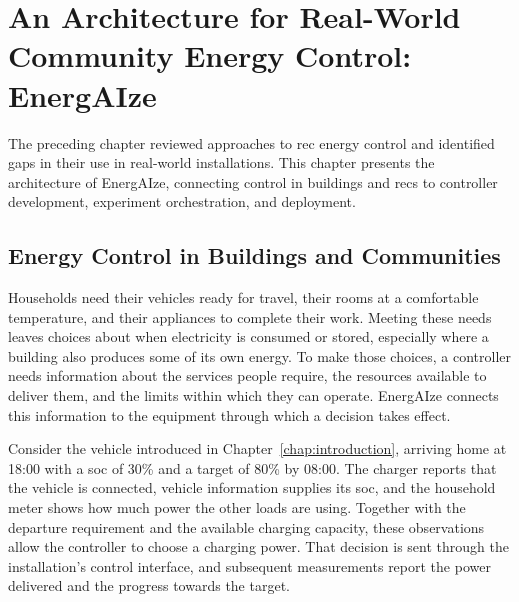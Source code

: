 \chapter{An Architecture for Real-World Community Energy Control: EnergAIze}
\label{chap:energAIze}
\label{chap:lifecycle}
\newlength{\architectureoriginalparskip}
\setlength{\architectureoriginalparskip}{\parskip}
\setlength{\parskip}{0pt}
\newlength{\architectureoriginaltextfloatsep}
\newlength{\architectureoriginalintextsep}
\newlength{\architectureoriginalcaptionskip}
\setlength{\architectureoriginaltextfloatsep}{\textfloatsep}
\setlength{\architectureoriginalintextsep}{\intextsep}
\setlength{\architectureoriginalcaptionskip}{\abovecaptionskip}
\setlength{\textfloatsep}{12pt plus 2pt minus 2pt}
\setlength{\intextsep}{12pt plus 2pt minus 2pt}
\setlength{\abovecaptionskip}{6pt}
\raggedbottom
\edef\architectureoriginalclubpenalty{\the\clubpenalty}
\edef\architectureoriginalwidowpenalty{\the\widowpenalty}

The preceding chapter reviewed approaches to \gls{rec} energy control and identified gaps in their use in real-world installations. This chapter presents the architecture of EnergAIze, connecting control in buildings and \glspl{rec} to controller development, experiment orchestration, and deployment.

\section{Energy Control in Buildings and Communities}
\label{sec:energAIze-overview}
\label{sec:energaize-overview}
\label{sec:energAIze-functional-view}
\label{sec:energaize-community-view}

Households need their vehicles ready for travel, their rooms at a comfortable temperature, and their appliances to complete their work. Meeting these needs leaves choices about when electricity is consumed or stored, especially where a building also produces some of its own energy. To make those choices, a controller needs information about the services people require, the resources available to deliver them, and the limits within which they can operate. EnergAIze connects this information to the equipment through which a decision takes effect.

Consider the vehicle introduced in Chapter~\ref{chap:introduction}, arriving home at 18:00 with a \gls{soc} of 30\% and a target of 80\% by 08:00. The charger reports that the vehicle is connected, vehicle information supplies its \gls{soc}, and the household meter shows how much power the other loads are using. Together with the departure requirement and the available charging capacity, these observations allow the controller to choose a charging power. That decision is sent through the installation's control interface, and subsequent measurements report the power delivered and the progress towards the target.

